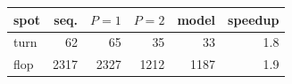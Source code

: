 \begin{tabular}{lrrrrr}
\toprule
spot & seq. & $P=1$ & $P=2$ & model & speedup \\ \midrule
turn & 62 & 65 & 35 & 33 & 1.8 \\
flop & 2317 & 2327 & 1212 & 1187 & 1.9 \\
\bottomrule
\end{tabular}
